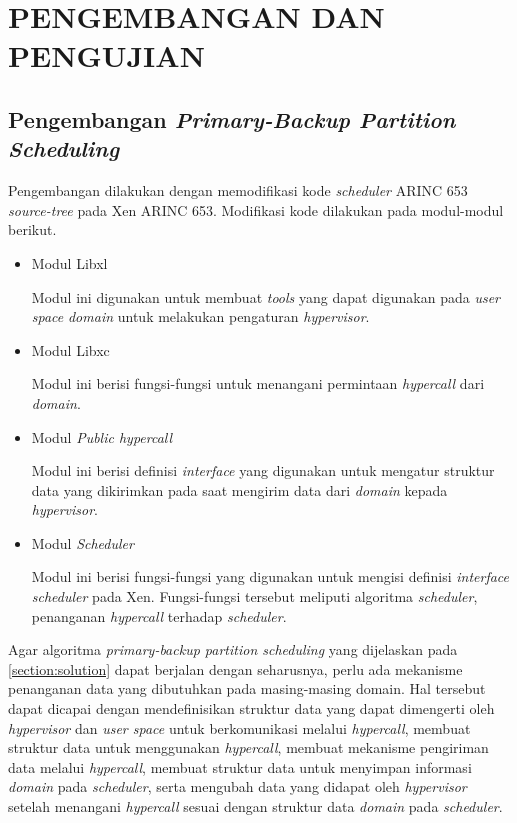 \chapter{PENGEMBANGAN DAN PENGUJIAN}

\section{Pengembangan \textit{Primary-Backup Partition Scheduling}}

Pengembangan dilakukan dengan memodifikasi kode \textit{scheduler} ARINC 653
\textit{source-tree} pada Xen ARINC 653.  Modifikasi kode dilakukan pada modul-modul berikut.

\begin{itemize}

	\item Modul Libxl

	Modul ini digunakan untuk membuat \textit{tools} yang dapat digunakan pada \textit{user
	space} \textit{domain}  untuk melakukan pengaturan \textit{hypervisor}.

	\item Modul Libxc

	Modul ini berisi fungsi-fungsi untuk menangani permintaan \textit{hypercall} dari
	\textit{domain}.

	\item Modul \textit{Public hypercall}

	Modul ini berisi definisi \textit{interface} yang digunakan untuk mengatur struktur data
	yang dikirimkan pada saat mengirim data dari \textit{domain} kepada \textit{hypervisor}.

	\item Modul \textit{Scheduler}

	Modul ini berisi fungsi-fungsi yang digunakan untuk mengisi definisi \textit{interface}
	\textit{scheduler} pada Xen. Fungsi-fungsi tersebut meliputi algoritma
	\textit{scheduler}, penanganan \textit{hypercall} terhadap \textit{scheduler}.

\end{itemize}

Agar algoritma \textit{primary-backup partition scheduling} yang dijelaskan pada
\autoref{section:solution} dapat berjalan dengan seharusnya, perlu ada mekanisme penanganan data
yang dibutuhkan pada masing-masing domain. Hal tersebut dapat dicapai dengan mendefinisikan
struktur data yang dapat dimengerti oleh \textit{hypervisor} dan \textit{user space} untuk
berkomunikasi melalui \textit{hypercall}, membuat struktur data untuk menggunakan
\textit{hypercall}, membuat mekanisme pengiriman data melalui \textit{hypercall}, membuat
struktur data untuk menyimpan informasi \textit{domain} pada \textit{scheduler}, serta mengubah
data yang didapat oleh \textit{hypervisor} setelah menangani \textit{hypercall} sesuai dengan
struktur data \textit{domain} pada \textit{scheduler}.

